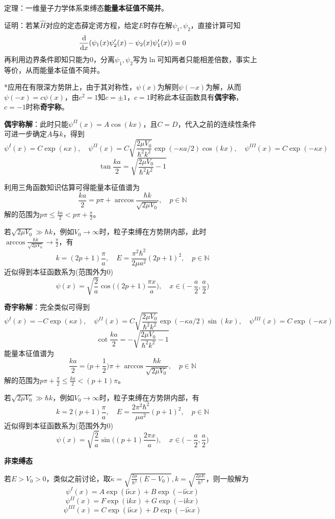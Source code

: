 \documentclass[a4paper,UTF8,fontset=windows]{ctexart}
\newcommand*{\dr}{\hspace{0.07em}\mathrm{d}}
\newcommand*{\ir}{\mathrm{i}}
\begin{document}
定理：一维量子力学体系束缚态\textbf{能量本征值不简并}。

证明：若某$\hat{H}$对应的定态薛定谔方程，给定$E$时存在解$\psi_1,\psi_2$，直接计算可知
$$\frac{\dr}{\dr x}(\psi_1(x)\psi_2'(x)-\psi_2(x)\psi_1'(x))=0$$
再利用边界条件即知只能为0，分离$\psi_1,\psi_2$写为$\ln$可知两者只能相差倍数，事实上等价，从而能量本征值不简并。

*应用在有限深方势阱上，由于其对称性，$\psi(x)$为解则$\psi(-x)$为解，从而$\psi(-x)=c\psi(x)$，由$c^2=1$知$c=\pm1$，$c=1$时称此本征函数具有\textbf{偶宇称}，$c=-1$时称\textbf{奇宇称}。

\textbf{偶宇称解}：此时只能$\psi^{II}(x)=A\cos(kx)$，且$C=D$，代入之前的连续性条件可进一步确定$A$与$k$，得到
$$\psi^I(x)=C\exp(\kappa x),\quad\psi^{II}(x)=C\sqrt{\frac{2\mu V_0}{\hbar^2k^2}}\exp(-\kappa a/2)\cos(kx),\quad\psi^{III}(x)=C\exp(-\kappa x)$$
$$\tan\frac{ka}{2}=\sqrt{\frac{2\mu V_0}{\hbar^2k^2}-1}$$

利用三角函数知识估算可得能量本征值谱为
$$\frac{ka}{2}=p\pi+\arccos\frac{\hbar k}{\sqrt{2\mu V_0}},\quad p\in\mathbb{N}$$
解的范围为$p\pi\le\frac{ka}{2}<p\pi+\frac{\pi}{2}$。

若$\sqrt{2\mu V_0}\gg\hbar k$，例如$V_0\to\infty$时，粒子束缚在方势阱内部，此时$\arccos\frac{\hbar k}{\sqrt{2\mu V_0}}\to\frac{\pi}{2}$，有
$$k=(2p+1)\frac{\pi}{a},\quad E=\frac{\pi^2\hbar^2}{2\mu a^2}(2p+1)^2,\quad p\in\mathbb{N}$$
近似得到本征函数系为(范围外为0)
$$\psi(x)=\sqrt{\frac{2}{a}}\cos\bigg((2p+1)\frac{\pi x}{a}\bigg),\quad x\in\bigg(-\frac{a}{2},\frac{a}{2}\bigg)$$

\textbf{奇宇称解}：完全类似可得到
$$\psi^I(x)=-C\exp(\kappa x),\quad\psi^{II}(x)=C\sqrt{\frac{2\mu V_0}{\hbar^2k^2}}\exp(-\kappa a/2)\sin(kx),\quad\psi^{III}(x)=C\exp(-\kappa x)$$
$$\cot\frac{ka}{2}=-\sqrt{\frac{2\mu V_0}{\hbar^2k^2}-1}$$
能量本征值谱为
$$\frac{ka}{2}=\bigg(p+\frac{1}{2}\bigg)\pi+\arccos\frac{\hbar k}{\sqrt{2\mu V_0}},\quad p\in\mathbb{N}$$
解的范围为$p\pi+\frac{\pi}{2}\le\frac{ka}{2}<(p+1)\pi$。

若$\sqrt{2\mu V_0}\gg\hbar k$，例如$V_0\to\infty$时，粒子束缚在方势阱内部，有
$$k=2(p+1)\frac{\pi}{a},\quad E=\frac{2\pi^2\hbar^2}{\mu a^2}(p+1)^2,\quad p\in\mathbb{N}$$
近似得到本征函数系为(范围外为0)
$$\psi(x)=\sqrt{\frac{2}{a}}\sin\bigg((p+1)\frac{2\pi x}{a}\bigg),\quad x\in\bigg(-\frac{a}{2},\frac{a}{2}\bigg)$$

\textbf{非束缚态}

若$E>V_0>0$，类似之前讨论，取$\tilde{\kappa}=\sqrt{\frac{2\mu}{\hbar^2}(E-V_0)},k=\sqrt{\frac{2\mu E}{\hbar^2}}$，则一般解为
$$\psi^I(x)=A\exp(\ir\tilde{\kappa}x)+B\exp(-\ir\tilde{\kappa}x)$$
$$\psi^{II}(x)=F\exp(\ir kx)+G\exp(-\ir kx)$$
$$\psi^{III}(x)=C\exp(\ir\tilde{\kappa}x)+D\exp(-\ir\tilde{\kappa}x)$$
\end{document}
